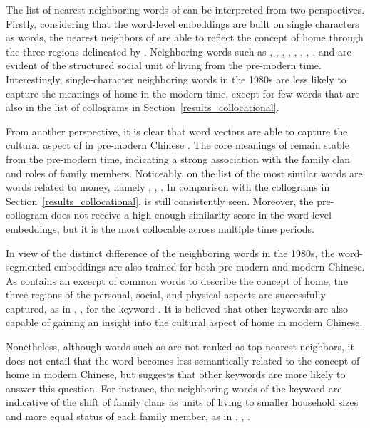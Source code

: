 The list of nearest neighboring words of \jia can be interpreted from two perspectives. Firstly, considering that the word-level embeddings are built on single characters as words, the nearest neighbors of \jia are able to reflect the concept of home through the three regions delineated by \textcite{sixsmith1986meaning}. Neighboring words such as , , , , , , , , and  are evident of the structured social unit of living from the pre-modern time. Interestingly, single-character neighboring words in the 1980s are less likely to capture the meanings of home in the modern time, except for few words that are also in the list of collograms in Section~\ref{results_collocational}.

From another perspective, it is clear that word vectors are able to capture the cultural aspect of \jia in pre-modern Chinese \parencite{hamilton2016cultural}. The core meanings of \jia remain stable from the pre-modern time, indicating a strong association with the family clan and roles of family members. Noticeably, on the list of the most similar words are words related to money, namely , , . In comparison with the collograms in Section~\ref{results_collocational},  is still consistently seen. Moreover, the pre-collogram  does not receive a high enough similarity score in the word-level embeddings, but it is the most collocable across multiple time periods.

In view of the distinct difference of the neighboring words in the 1980s, the word-segmented embeddings are also trained for both pre-modern and modern Chinese. As  contains an excerpt of common words to describe the concept of home, the three regions of the personal, social, and physical aspects are successfully captured, as in , ,  for the keyword \jia\rspace. It is believed that other keywords are also capable of gaining an insight into the cultural aspect of home in modern Chinese.

Nonetheless, although words such as  are not ranked as top nearest neighbors, it does not entail that the word becomes less semantically related to the concept of home in modern Chinese, but suggests that other keywords are more likely to answer this question. For instance, the neighboring words of the keyword  are indicative of the shift of family clans as units of living to smaller household sizes and more equal status of each family member, as in , , .

